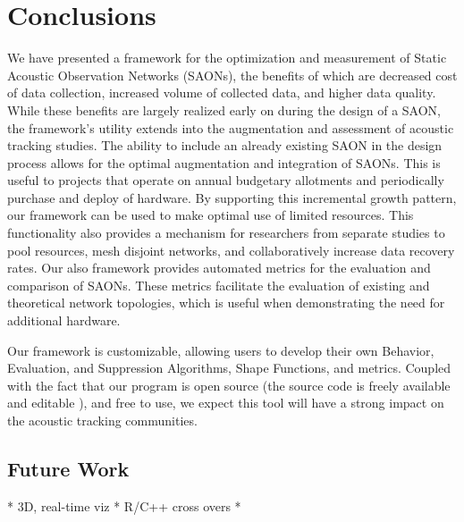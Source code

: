 \chapter{Conclusions}
We have presented a framework for the optimization and measurement of Static Acoustic Observation Networks (SAONs), the benefits of which are decreased cost of data collection, increased volume of collected data, and higher data quality.  While these benefits are largely realized early on during the design of a SAON, the framework's utility extends into the augmentation and assessment of acoustic tracking studies.  The ability to include an already existing SAON in the design process allows for the optimal augmentation and integration of SAONs.  This is useful to projects that operate on annual budgetary allotments and periodically purchase and deploy of hardware.  By supporting this incremental growth pattern, our framework can be used to make optimal use of limited resources.  This functionality also provides a mechanism for researchers from separate studies to pool resources, mesh disjoint networks, and collaboratively increase data recovery rates.  Our also framework provides automated metrics for the evaluation and comparison of SAONs.  These metrics facilitate the evaluation of existing and theoretical network topologies, which is useful when demonstrating the need for additional hardware.

Our framework is customizable, allowing users to develop their own Behavior, Evaluation, and Suppression Algorithms, Shape Functions, and metrics.  Coupled with the fact that our program is open source (the source code is freely available and editable \cite{acousitcdeploy}), and free to use, we expect this tool will have a strong impact on the acoustic tracking communities.  

\section{Future Work}
* 3D, real-time viz
* R/C++ cross overs
* 